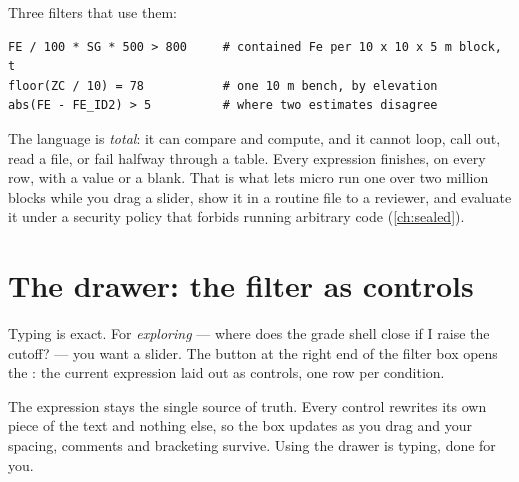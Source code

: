 Three filters that use them:

\begin{lstlisting}[language=expr]
FE / 100 * SG * 500 > 800     # contained Fe per 10 x 10 x 5 m block, t
floor(ZC / 10) = 78           # one 10 m bench, by elevation
abs(FE - FE_ID2) > 5          # where two estimates disagree
\end{lstlisting}

\begin{why}
The language is \emph{total}: it can compare and compute, and it cannot loop, call out, read a file, or fail halfway through a table. Every expression finishes, on every row, with a value or a blank. That is what lets micro run one over two million blocks while you drag a slider, show it in a routine file to a reviewer, and evaluate it under a security policy that forbids running arbitrary code (\cref{ch:sealed}).
\end{why}

\section{The drawer: the filter as controls}\label{sec:filter-drawer}
Typing is exact. For \emph{exploring} — where does the grade shell close if I raise the cutoff? — you want a slider. The  button at the right end of the filter box opens the : the current expression laid out as controls, one row per condition.

The expression stays the single source of truth. Every control rewrites its own piece of the text and nothing else, so the box updates as you drag and your spacing, comments and bracketing survive. Using the drawer is typing, done for you.


